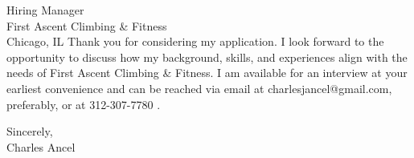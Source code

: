 \documentclass{letter}
\begin{document}
\begin{letter}{Hiring Manager\\First Ascent Climbing \& Fitness\\Chicago, IL}
Thank you for considering my application. I look forward to the opportunity to discuss how my background, skills, and experiences align with the needs of First Ascent Climbing \& Fitness. I am available for an interview at your earliest convenience and can be reached via email at charlesjancel@gmail.com, preferably, or at 312-307-7780 .

\begin{flushleft}
Sincerely,\\
Charles Ancel
\end{flushleft}

\end{letter}
\end{document}

